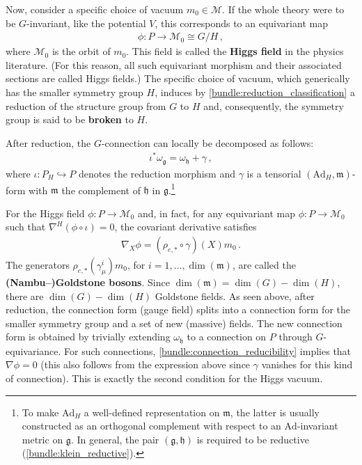     Now, consider a specific choice of vacuum $m_0\in\mathcal{M}$. If the whole theory were to be $G$-invariant, like the potential $V$, this corresponds to an equivariant map
    \begin{gather}
        \phi:P\rightarrow \mathcal{M}_0\cong G/H\,,
    \end{gather}
    where $\mathcal{M}_0$ is the orbit of $m_0$. This field is called the \textbf{Higgs field} in the physics literature. (For this reason, all such equivariant morphism and their associated sections are called Higgs fields.) The specific choice of vacuum, which generically has the smaller symmetry group $H$, induces by \cref{bundle:reduction_classification} a reduction of the structure group from $G$ to $H$ and, consequently, the symmetry group is said to be \textbf{broken} to $H$.

    After reduction, the $G$-connection can locally be decomposed as follows:
    \begin{gather}
        \iota^*\omega_{\mathfrak{g}} = \omega_{\mathfrak{h}} + \gamma\,,
    \end{gather}
    where $\iota:P_H\hookrightarrow P$ denotes the reduction morphism and $\gamma$ is a tensorial $(\mathrm{Ad}_H,\mathfrak{m})$-form with $\mathfrak{m}$ the complement of $\mathfrak{h}$ in $\mathfrak{g}$.\footnote{To make $\mathrm{Ad}_H$ a well-defined representation on $\mathfrak{m}$, the latter is usually constructed as an orthogonal complement with respect to an $\mathrm{Ad}$-invariant metric on $\mathfrak{g}$. In general, the pair $(\mathfrak{g},\mathfrak{h})$ is required to be reductive (\cref{bundle:klein_reductive}).}

    For the Higgs field $\phi:P\rightarrow\mathcal{M}_0$ and, in fact, for any equivariant map $\phi:P\rightarrow\mathcal{M}_0$ such that $\nabla^H(\phi\circ\iota)=0$, the covariant derivative satisfies
    \begin{gather}
        \nabla_X\phi = (\rho_{e,\ast}\circ\gamma)(X)m_0\,.
    \end{gather}
    The generators $\rho_{e,\ast}(\gamma^i_\mu)m_0$, for $i=1,\ldots,\dim(\mathfrak{m})$, are called the \textbf{(Nambu--)Goldstone bosons}. Since $\dim(\mathfrak{m})=\dim(G)-\dim(H)$, there are $\dim(G)-\dim(H)$ Goldstone fields. As seen above, after reduction, the connection form (gauge field) splits into a connection form for the smaller symmetry group and a set of new (massive) fields. The new connection form is obtained by trivially extending $\omega_{\mathfrak{h}}$ to a connection on $P$ through $G$-equivariance. For such connections, \cref{bundle:connection_reducibility} implies that $\nabla\phi=0$ (this also follows from the expression above since $\gamma$ vanishes for this kind of connection). This is exactly the second condition for the Higgs vacuum.

